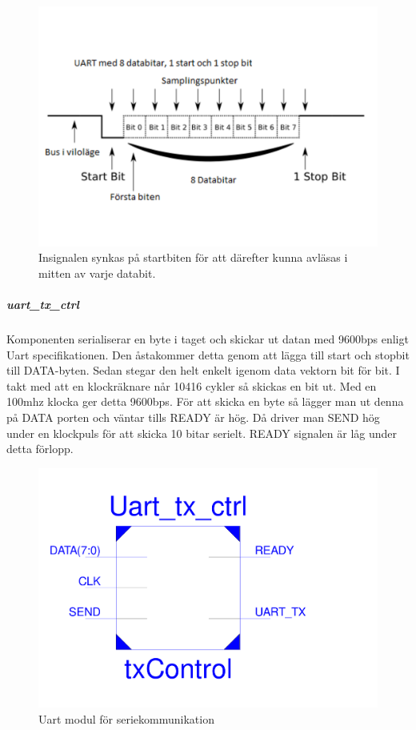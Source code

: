 \documentclass[a4paper]{scrartcl}
\begin{document}
		\begin{figure}[H]
			\centering
			\includegraphics[scale=0.4]{uartsignal.pdf}
			\caption{Insignalen synkas på startbiten för att därefter kunna avläsas i mitten av varje databit.}
		\end{figure}



		\subparagraph{uart\_tx\_ctrl}
		Komponenten serialiserar en byte i taget och skickar ut datan med 9600bps enligt Uart specifikationen. Den åstakommer detta genom att lägga till start och stopbit till DATA-byten. Sedan stegar den helt enkelt igenom data vektorn bit för bit.  I takt med att en klockräknare når 10416 cykler så skickas en bit ut.  Med en 100mhz klocka ger detta 9600bps.
		För att skicka en byte så lägger man ut denna på DATA porten och väntar tills READY är hög. Då driver man SEND hög under en klockpuls för att skicka 10 bitar serielt. READY signalen är låg under detta förlopp.

		\begin{figure}[H]
			\centering
			\includegraphics[scale=0.4]{txschematic.pdf}
			\caption{Uart modul för seriekommunikation}
		\end{figure}
\end{document}
